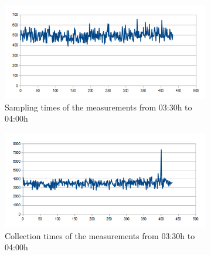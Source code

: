 \begin{figure}[htbp]
	\centering
	\begin{subfigure}[t]{1\textwidth}
		\centering
    		\includegraphics[scale=0.75]{content/images/Experiment/DayRounds}
   	 	\caption{Sampling times of the measurements from 03:30h to 04:00h}
    	\label{fig:DayR}
    \end{subfigure}
 
    \begin{subfigure}[t]{1\textwidth}
		\centering         
        \includegraphics[scale=0.75]{content/images/Experiment/DayCollection}
        \caption{Collection times of the measurements from 03:30h to 04:00h}
        \label{fig:dayC}
    \end{subfigure}
    \caption{}
\end{figure}